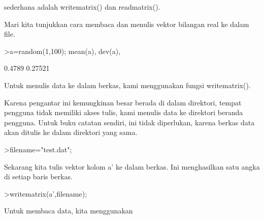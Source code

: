 \documentclass[a4paper,10pt]{article}
\begin{document}
\begin{eulernotebook}
\begin{eulercomment}
\begin{eulercomment}
\begin{eulercomment}
\begin{eulercomment}
\begin{eulercomment}
\begin{eulercomment}
\begin{eulercomment}
\begin{eulercomment}
\begin{eulercomment}
\begin{eulercomment}
\begin{eulercomment}
\begin{eulercomment}
\begin{eulercomment}
\begin{eulercomment}
\begin{eulercomment}
\begin{eulercomment}
\begin{eulercomment}
\begin{eulercomment}
\begin{eulercomment}
\begin{eulercomment}
\begin{eulercomment}
\begin{eulercomment}
\begin{eulercomment}
\begin{eulercomment}
\begin{eulercomment}
\begin{eulercomment}
\begin{eulercomment}
\begin{eulercomment}
\begin{eulercomment}
\begin{eulercomment}
\begin{eulercomment}
\begin{eulercomment}
\begin{eulercomment}
\begin{eulercomment}
\begin{eulercomment}
\begin{eulercomment}
\begin{eulercomment}
\begin{eulercomment}
\begin{eulercomment}
\begin{eulercomment}
\begin{eulercomment}
\begin{eulercomment}
\begin{eulercomment}
\begin{eulercomment}
\begin{eulercomment}
\begin{eulercomment}
\begin{eulercomment}
\begin{eulercomment}
\begin{eulercomment}
\begin{eulercomment}
\begin{eulercomment}
\begin{eulercomment}
\begin{eulercomment}
\begin{eulercomment}
\begin{eulercomment}
\begin{eulercomment}
\begin{eulercomment}
\begin{eulercomment}
\begin{eulercomment}
\begin{eulercomment}
\begin{eulercomment}
\begin{eulercomment}
\begin{eulercomment}
\begin{eulercomment}
\begin{eulercomment}
\begin{eulercomment}
\begin{eulercomment}
\begin{eulercomment}
\begin{eulercomment}
\begin{eulercomment}
\begin{eulercomment}
sederhana adalah writematrix() dan readmatrix().

Mari kita tunjukkan cara membaca dan menulis vektor bilangan real ke
dalam file.
\end{eulercomment}
\begin{eulerprompt}
>a=random(1,100); mean(a), dev(a),
\end{eulerprompt}
\begin{euleroutput}
  0.4789
  0.27521
\end{euleroutput}
\begin{eulercomment}
Untuk menulis data ke dalam berkas, kami menggunakan fungsi
writematrix().

Karena pengantar ini kemungkinan besar berada di dalam direktori,
tempat pengguna tidak memiliki akses tulis, kami menulis data ke
direktori beranda pengguna. Untuk buku catatan sendiri, ini tidak
diperlukan, karena berkas data akan ditulis ke dalam direktori yang
sama.
\end{eulercomment}
\begin{eulerprompt}
>filename="test.dat";
\end{eulerprompt}
\begin{eulercomment}
Sekarang kita tulis vektor kolom a' ke dalam berkas. Ini menghasilkan
satu angka di setiap baris berkas.
\end{eulercomment}
\begin{eulerprompt}
>writematrix(a',filename);
\end{eulerprompt}
\begin{eulercomment}
Untuk membaca data, kita menggunakan 
\end{eulercomment}
\end{eulercomment}
\end{eulercomment}
\end{eulercomment}
\end{eulercomment}
\end{eulercomment}
\end{eulercomment}
\end{eulercomment}
\end{eulercomment}
\end{eulercomment}
\end{eulercomment}
\end{eulercomment}
\end{eulercomment}
\end{eulercomment}
\end{eulercomment}
\end{eulercomment}
\end{eulercomment}
\end{eulercomment}
\end{eulercomment}
\end{eulercomment}
\end{eulercomment}
\end{eulercomment}
\end{eulercomment}
\end{eulercomment}
\end{eulercomment}
\end{eulercomment}
\end{eulercomment}
\end{eulercomment}
\end{eulercomment}
\end{eulercomment}
\end{eulercomment}
\end{eulercomment}
\end{eulercomment}
\end{eulercomment}
\end{eulercomment}
\end{eulercomment}
\end{eulercomment}
\end{eulercomment}
\end{eulercomment}
\end{eulercomment}
\end{eulercomment}
\end{eulercomment}
\end{eulercomment}
\end{eulercomment}
\end{eulercomment}
\end{eulercomment}
\end{eulercomment}
\end{eulercomment}
\end{eulercomment}
\end{eulercomment}
\end{eulercomment}
\end{eulercomment}
\end{eulercomment}
\end{eulercomment}
\end{eulercomment}
\end{eulercomment}
\end{eulercomment}
\end{eulercomment}
\end{eulercomment}
\end{eulercomment}
\end{eulercomment}
\end{eulercomment}
\end{eulercomment}
\end{eulercomment}
\end{eulercomment}
\end{eulercomment}
\end{eulercomment}
\end{eulercomment}
\end{eulercomment}
\end{eulercomment}
\end{eulercomment}
\end{eulernotebook}
\end{document}
